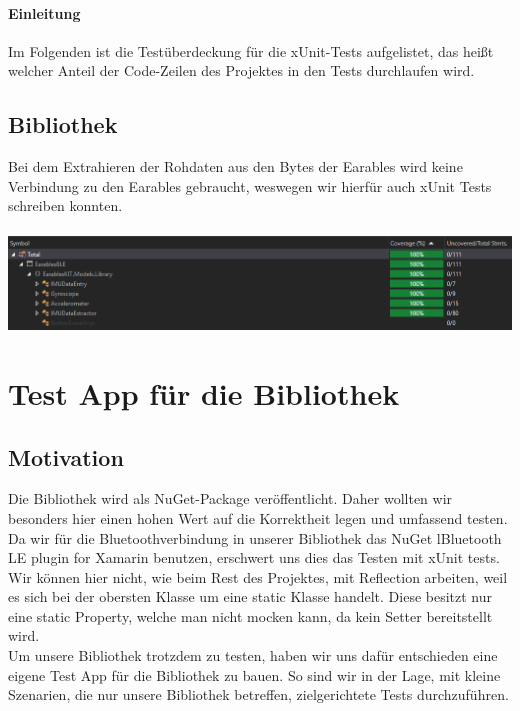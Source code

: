 \documentclass[a4paper,12pt]{article}
\begin{document}
\paragraph{Einleitung}
Im Folgenden ist die Testüberdeckung für die xUnit-Tests aufgelistet, das heißt welcher Anteil der Code-Zeilen des Projektes in den Tests durchlaufen wird.

\subsection{Bibliothek}
Bei dem Extrahieren der Rohdaten aus den Bytes der Earables wird keine Verbindung zu den Earables gebraucht, weswegen wir hierfür auch xUnit Tests schreiben konnten.
\\ \\ 
\includegraphics[width=1\textwidth]{./bilder/BibTestCoverage/Testcoverage.PNG}



\section{Test App für die Bibliothek}
\subsection{Motivation}
Die Bibliothek wird als NuGet-Package veröffentlicht. Daher wollten wir besonders hier einen hohen Wert auf die Korrektheit legen und umfassend testen.\\
Da wir für die Bluetoothverbindung in unserer Bibliothek das NuGet \glqq{}lBluetooth LE plugin for Xamarin\grqq{} benutzen, erschwert uns dies das Testen mit xUnit tests. Wir können hier nicht, wie beim Rest des Projektes, mit Reflection arbeiten, weil es sich bei der \glqq{}obersten Klasse\grqq{} um eine static Klasse handelt. Diese besitzt nur eine static Property, welche man nicht mocken kann, da kein Setter bereitstellt wird.\\
 Um unsere Bibliothek trotzdem zu testen, haben wir uns dafür entschieden eine eigene Test App für die Bibliothek zu bauen. So sind wir in der Lage, mit kleine Szenarien, die nur unsere Bibliothek betreffen, zielgerichtete Tests durchzuführen.
\end{document}
